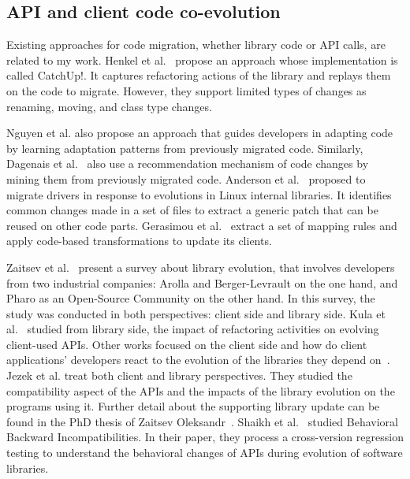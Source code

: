  
 \subsection{API and client code co-evolution}
 \label{API_evolution}
 
 
 Existing approaches for code migration, whether library code or API calls, are related to my work. %
   Henkel et al.~\cite{henkel2005catchup} propose an approach whose implementation is called CatchUp!. It captures refactoring actions of the library and replays them on the code to migrate. However, they support limited types of changes as renaming, moving, and class type changes. 
 
 Nguyen et al. \cite{nguyen2010graph} also propose an approach that guides developers in adapting code by learning adaptation patterns from previously migrated code. Similarly, Dagenais et al.~\cite{dagenais2011recommending,5070565,10.1145/1932682.1869486} also use a recommendation mechanism of code changes by mining them from previously migrated code. 
 Anderson et al.~\cite{andersen2010generic} proposed to migrate drivers in response to evolutions in Linux internal libraries. It identifies common changes made in a set of files to extract a generic patch that can be reused on other code parts. Gerasimou et al.~\cite{10.1145/3194793.3194798} extract a set of mapping rules and apply code-based transformations to update its clients.
 
 
 Zaitsev et al.~\cite{10043250} present a survey about library evolution, that involves developers from two industrial companies: Arolla and Berger-Levrault on the one hand, and Pharo as an Open-Source Community on the other hand. In this survey, the study was conducted in both perspectives: client side and library side. Kula et al.~\cite{10.1016/j.infsof.2017.09.007} studied from library side, the impact of refactoring activities on evolving client-used APIs.
 Other works focused on the client side and how do client applications' developers react to the evolution of the libraries they depend on~\cite{10.1145/2393596.2393662,7332471,7816485,7884616,10.1007/s11219-016-9344-4,10.1007/s10664-017-9521-5}. Jezek et al. \cite{10.1016/j.infsof.2015.02.014} treat both client and library perspectives. They studied the compatibility aspect of the APIs and the impacts of the library evolution on the programs using it. Further detail about the supporting library update can be found in the PhD thesis of Zaitsev Oleksandr~\cite{zaytsev:tel-03998632}. Shaikh et al.~\cite{10.1145/3092703.3092721} studied Behavioral Backward Incompatibilities. In their paper, they process a cross-version regression testing to understand the behavioral changes of APIs during evolution of software libraries.

